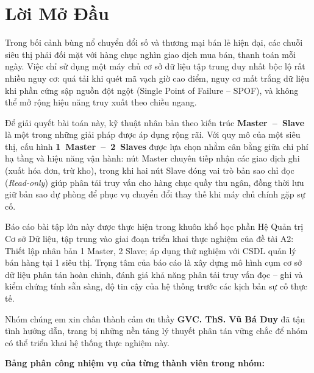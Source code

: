 \documentclass[12pt,a4paper]{report}
\begin{document}
\hypersetup{pageanchor=true}

\chapter*{Lời Mở Đầu}

Trong bối cảnh bùng nổ chuyển đổi số và thương mại bán lẻ hiện đại, các chuỗi siêu thị phải đối mặt với hàng chục nghìn giao dịch mua bán, thanh toán mỗi ngày. Việc chỉ sử dụng một máy chủ cơ sở dữ liệu tập trung duy nhất bộc lộ rất nhiều nguy cơ: quá tải khi quét mã vạch giờ cao điểm, nguy cơ mất trắng dữ liệu khi phần cứng sập nguồn đột ngột (Single Point of Failure -- SPOF), và không thể mở rộng hiệu năng truy xuất theo chiều ngang.

Để giải quyết bài toán này, kỹ thuật nhân bản theo kiến trúc \mbox{\textbf{Master -- Slave}} là một trong những giải pháp được áp dụng rộng rãi. Với quy mô của một siêu thị, cấu hình \mbox{\textbf{1 Master -- 2 Slaves}} được lựa chọn nhằm cân bằng giữa chi phí hạ tầng và hiệu năng vận hành: nút Master chuyên tiếp nhận các giao dịch ghi (xuất hóa đơn, trừ kho), trong khi hai nút Slave đóng vai trò bản sao chỉ đọc (\textit{Read-only}) giúp phân tải truy vấn cho hàng chục quầy thu ngân, đồng thời lưu giữ bản sao dự phòng để phục vụ chuyển đổi thay thế khi máy chủ chính gặp sự cố.

Báo cáo bài tập lớn này được thực hiện trong khuôn khổ học phần Hệ Quản trị Cơ sở Dữ liệu, tập trung vào giai đoạn triển khai thực nghiệm của đề tài A2: Thiết lập nhân bản 1 Master, 2 Slave; áp dụng thử nghiệm với CSDL quản lý bán hàng tại 1 siêu thị. Trọng tâm của báo cáo là xây dựng mô hình cụm cơ sở dữ liệu phân tán hoàn chỉnh, đánh giá khả năng phân tải truy vấn đọc -- ghi và kiểm chứng tính sẵn sàng, độ tin cậy của hệ thống trước các kịch bản sự cố thực tế.

Nhóm chúng em xin chân thành cảm ơn thầy \textbf{GVC. ThS. Vũ Bá Duy} đã tận tình hướng dẫn, trang bị những nền tảng lý thuyết phân tán vững chắc để nhóm có thể triển khai hệ thống thực nghiệm này.

\vspace{1cm}
\noindent \textbf{Bảng phân công nhiệm vụ của từng thành viên trong nhóm:}
\end{document}
